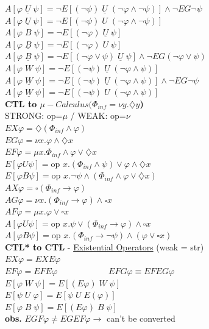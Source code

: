 \documentclass{article}
\begin{document}
\begin{multicols}{4}
$A[\varphi \; \underline{U} \; \psi] =  \neg E[(\neg \psi) \; \underline{U}\; (\neg \varphi \wedge \neg \psi)]\wedge \neg EG \neg \psi$ \\
$A[\varphi \; \underline{U} \; \psi] =  \neg E[(\neg \psi) \; U\; (\neg \varphi \wedge \neg \psi)]$ \\
$A[\varphi \; B\; \psi]=  \neg E[(\neg \varphi)\; \underline{U} \; \psi] $ \\
$A[\varphi \; \underline{B}\; \psi]=  \neg E[(\neg \varphi)\; U \; \psi] $ \\
$A[\varphi \; \underline{B} \; \psi] =  \neg E[(\neg \varphi \vee \psi) \; \underline{U}\; \psi] \wedge \neg EG(\neg \varphi \vee \psi)$ \\
$A[\varphi \; W\; \psi]=  \neg E[(\neg \psi) \; \underline{U}\; (\neg \varphi \wedge \psi)]$ \\
$A[\varphi \; \underline{W} \; \psi] =  \neg E[(\neg \psi) \; \underline{U}\; (\neg \varphi \wedge \psi)] \wedge \neg EG\neg \psi $ \\
$A[\varphi \; \underline{W} \; \psi] =  \neg E[(\neg \psi) \; U\; (\neg \varphi \wedge \psi)]$\\
\textbf{CTL to $\mu -Calculus (\Phi _{inf} = \nu y.\diamondsuit y$)}\\
STRONG: op=$\mu$ / WEAK: op=$\nu$\\
$EX\varphi = \diamondsuit (\Phi_{inf} \wedge \varphi)$ \\
$EG\varphi = \nu x.\varphi \wedge \diamondsuit x $ \\
$EF\varphi = \mu x.\Phi_{inf} \wedge \varphi \vee \diamondsuit x  $ \\
$E[ \varphi U \psi] = \text{op } x.(\Phi_{inf} \wedge \psi) \vee \varphi \wedge \diamondsuit x $ \\
$E[ \varphi B \psi] = \text{op } x.\neg\psi \wedge (\Phi_{inf} \wedge \varphi \vee \diamondsuit x) $ \\
$AX\varphi = \square (\Phi_{inf} \rightarrow \varphi)$ \\
$AG\varphi = \nu x.(\Phi_{inf} \rightarrow \varphi) \wedge \square x $ \\
$AF\varphi = \mu x.\varphi \vee \square x  $ \\
$A[ \varphi U \psi] = \text{op } x.\psi \vee (\Phi_{inf} \rightarrow \varphi) \wedge \square x $ \\
$A[ \varphi B \psi] = \text{op } x.(\Phi_{inf} \rightarrow \neg\psi) \wedge (\varphi \vee \square x)$\\
\textbf{CTL* to CTL} - \underline{Existential Operators} (weak = str)\\
$EX\varphi = EXE \varphi$\\
$EF\varphi = EFE\varphi\qquad \qquad \qquad EFG\varphi \equiv EFEG\varphi$\\
$E[\varphi\; W \; \psi]=E[(E\varphi)\; W \;\psi]$\\
$E[\psi\; U \; \varphi]=E[\psi \; U \;E(\varphi)]$\\
$E[\varphi\; B \; \psi]=E[(E\varphi)\; B \;\psi]$\\
\textbf{obs.} $EGF\varphi \neq EGEF\varphi \rightarrow$ can't be converted\\ 


\end{multicols}
\end{document}
